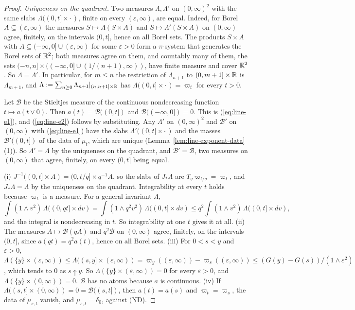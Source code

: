 \begin{proof}
\emph{Uniqueness on the quadrant.} Two measures $\Lambda, \Lambda'$ on $(0,\infty)^2$ with the
same slabs $\Lambda((0,t] \times \cdot\,)$, finite on every $(\varepsilon,\infty)$, are equal.
Indeed, for Borel $A \subseteq (\varepsilon,\infty)$ the measures $S \mapsto \Lambda(S \times A)$
and $S \mapsto \Lambda'(S \times A)$ on $(0,\infty)$ agree, finitely, on the intervals $(0,t]$,
hence on all Borel sets. The products $S \times A$ with
$A \subseteq (-\infty,0] \cup (\varepsilon,\infty)$ for some $\varepsilon > 0$ form a
$\pi$-system that generates the Borel sets of $\mathbb{R}^2$; both measures agree on them, and countably
many of them, the sets $(-n,n] \times ((-\infty,0] \cup (1/(n+1),\infty))$, have finite measure
and cover $\mathbb{R}^2$. So $\Lambda = \Lambda'$. In particular, for $m \le n$ the restriction of
$\Lambda_{n+1}$ to $(0, m+1] \times \mathbb{R}$ is $\Lambda_{m+1}$, and
$\Lambda := \sum_{n \ge 0}\Lambda_{n+1}|_{(n, n+1] \times \mathbb{R}}$ has
$\Lambda((0,t] \times \cdot\,) = \varpi_t$ for every $t > 0$.

Let $\mathcal{B}$ be the Stieltjes measure of the continuous nondecreasing function
$t \mapsto a(t \vee 0)$. Then $a(t) = \mathcal{B}((0,t])$ and $\mathcal{B}((-\infty,0]) = 0$.
This is (\ref{eq:line-e1}), and (\ref{eq:line-e2}) follows by substituting. Any $\Lambda'$ on $(0,\infty)^2$ and
$\mathcal{B}'$ on $(0,\infty)$ with (\ref{eq:line-e1}) have the slabs $\Lambda'((0,t] \times \cdot\,)$ and the
masses $\mathcal{B}'((0,t])$ of the data of $\mu_t$, which are unique
(Lemma~\ref{lem:line-exponent-data}(1)). So $\Lambda' = \Lambda$ by the uniqueness on the
quadrant, and $\mathcal{B}' = \mathcal{B}$, two measures on $(0,\infty)$ that agree, finitely, on
every $(0,t]$ being equal.

(i) $J^{-1}((0,t] \times A) = (0,t/q] \times q^{-1}A$, so the slabs of $J_*\Lambda$ are
$T_q\varpi_{t/q} = \varpi_t$, and $J_*\Lambda = \Lambda$ by the uniqueness on the quadrant.
Integrability at every $t$ holds because $\varpi_t$ is a \Levy{} measure. For a general invariant
$\Lambda$,
\[
  \int(1 \wedge v^2)\,\Lambda((0,qt] \times dv) = \int(1 \wedge q^2v^2)\,\Lambda((0,t] \times dv)
  \le q^2\int(1 \wedge v^2)\,\Lambda((0,t] \times dv),
\]
and the integral is nondecreasing in $t$. So integrability at one $t$ gives it at all.
(ii) The measures $A \mapsto \mathcal{B}(qA)$ and $q^2\mathcal{B}$ on $(0,\infty)$ agree, finitely,
on the intervals $(0,t]$, since $a(qt) = q^2a(t)$, hence on all Borel sets.
(iii) For $0 < s < y$ and $\varepsilon > 0$,
$\Lambda(\{y\} \times (\varepsilon,\infty)) \le \Lambda((s,y] \times (\varepsilon,\infty))
= \varpi_y((\varepsilon,\infty)) - \varpi_s((\varepsilon,\infty))
\le (G(y) - G(s))/(1 \wedge \varepsilon^2)$, which tends to $0$ as $s \uparrow y$. So
$\Lambda(\{y\} \times (\varepsilon,\infty)) = 0$ for every $\varepsilon > 0$, and
$\Lambda(\{y\} \times (0,\infty)) = 0$. $\mathcal{B}$ has no atoms because $a$ is continuous.
(iv) If $\Lambda((s,t] \times (0,\infty)) = 0 = \mathcal{B}((s,t])$, then $a(t) = a(s)$ and
$\varpi_t = \varpi_s$, the data of $\mu_{s,t}$ vanish, and $\mu_{s,t} = \delta_0$, against (ND).


\end{proof}
